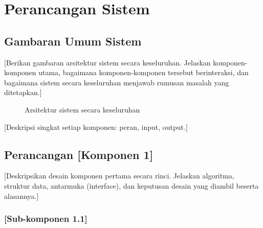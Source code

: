 
\chapter{Perancangan Sistem}

\section{Gambaran Umum Sistem}
\label{sec:4.1}

[Berikan gambaran arsitektur sistem secara keseluruhan. Jelaskan komponen-komponen utama,
bagaimana komponen-komponen tersebut berinteraksi, dan bagaimana sistem secara keseluruhan
menjawab rumusan masalah yang ditetapkan.]

\begin{figure}[H]
  \centering
  \caption{Arsitektur sistem secara keseluruhan}
  \label{fig:4.arsitektur}
\end{figure}

[Deskripsi singkat setiap komponen: peran, input, output.]

\section{Perancangan [Komponen 1]}
\label{sec:4.2}

[Deskripsikan desain komponen pertama secara rinci. Jelaskan algoritma, struktur data,
antarmuka (interface), dan keputusan desain yang diambil beserta alasannya.]

\subsection{[Sub-komponen 1.1]}
\label{sec:4.2.1}

